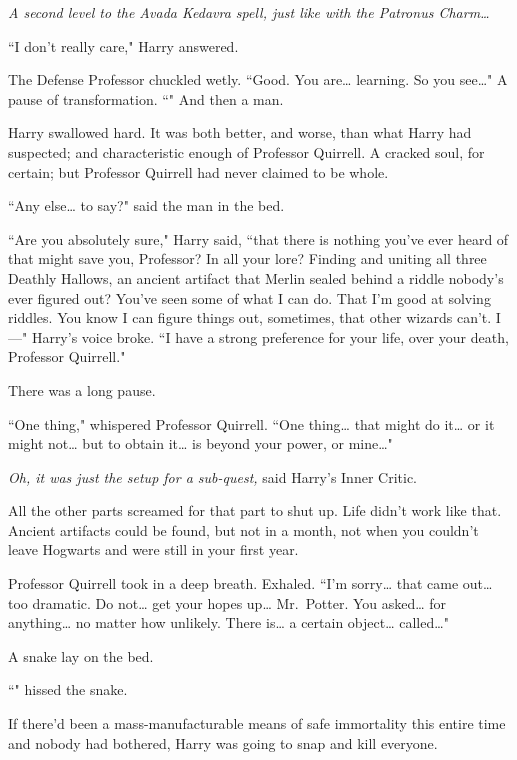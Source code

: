 \emph{A second level to the Avada Kedavra spell, just like with the Patronus Charm{\ldots}}

``I don't really care," Harry answered.

The Defense Professor chuckled wetly. ``Good. You are{\ldots} learning. So you see{\ldots}" A pause of transformation. ``" And then a man.

Harry swallowed hard. It was both better, and worse, than what Harry had suspected; and characteristic enough of Professor Quirrell. A cracked soul, for certain; but Professor Quirrell had never claimed to be whole.

``Any else{\ldots} to say?" said the man in the bed.

``Are you absolutely sure," Harry said, ``that there is nothing you've ever heard of that might save you, Professor? In all your lore? Finding and uniting all three Deathly Hallows, an ancient artifact that Merlin sealed behind a riddle nobody's ever figured out? You've seen some of what I can do. That I'm good at solving riddles. You know I can figure things out, sometimes, that other wizards can't. I—" Harry's voice broke. ``I have a strong preference for your life, over your death, Professor Quirrell."

There was a long pause.

``One thing," whispered Professor Quirrell. ``One thing{\ldots} that might do it{\ldots} or it might not{\ldots} but to obtain it{\ldots} is beyond your power, or mine{\ldots}"

\emph{Oh, it was just the setup for a sub-quest,} said Harry's Inner Critic.

All the other parts screamed for that part to shut up. Life didn't work like that. Ancient artifacts could be found, but not in a month, not when you couldn't leave Hogwarts and were still in your first year.

Professor Quirrell took in a deep breath. Exhaled. ``I'm sorry{\ldots} that came out{\ldots} too dramatic. Do not{\ldots} get your hopes up{\ldots} Mr.~Potter. You asked{\ldots} for anything{\ldots} no matter how unlikely. There is{\ldots} a certain object{\ldots} called{\ldots}"

A snake lay on the bed.

``" hissed the snake.

If there'd been a mass-manufacturable means of safe immortality this entire time and nobody had bothered, Harry was going to snap and kill everyone.

